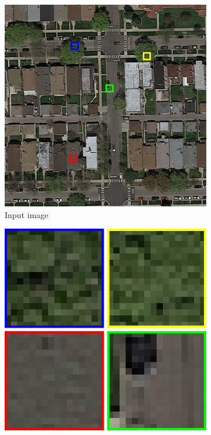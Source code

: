 \documentclass[10pt,conference,compsocconf]{IEEEtran}
\begin{document}
\begin{figure}	
	\centering
	\begin{subfigure}[t]{.2\textwidth}
		\includegraphics[width=1\textwidth]{figs/context_size/full_img}
		\caption{Input image}
	\end{subfigure}
	\begin{subfigure}[t]{.2\textwidth}
		\includegraphics[width=1\textwidth]{figs/context_size/context16}

\end{subfigure}
\end{figure}
\end{document}
